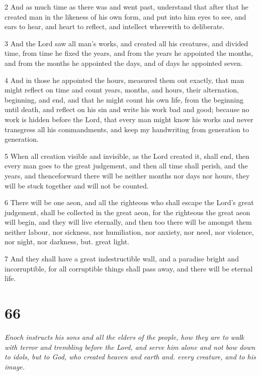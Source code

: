 \par 2 And as much time as there was and went past, understand that after that he created man in the likeness of his own form, and put into him eyes to see, and ears to hear, and heart to reflect, and intellect wherewith to deliberate.

\par 3 And the Lord saw all man's works, and created all his creatures, and divided time, from time he fixed the years, and from the years he appointed the months, and from the months he appointed the days, and of days he appointed seven.

\par 4 And in those he appointed the hours, measured them out exactly, that man might reflect on time and count years, months, and hours, their alternation, beginning, and end, and that he might count his own life, from the beginning until death, and reflect on his sin and write his work bad and good; because no work is hidden before the Lord, that every man might know his works and never transgress all his commandments, and keep my handwriting from generation to generation.

\par 5 When all creation visible and invisible, as the Lord created it, shall end, then every man goes to the great judgement, and then all time shall perish, and the years, and thenceforward there will be neither months nor days nor hours, they will be stuck together and will not be counted.

\par 6 There will be one aeon, and all the righteous who shall escape the Lord's great judgement, shall be collected in the great aeon, for the righteous the great aeon will begin, and they will live eternally, and then too there will be amongst them neither labour, nor sickness, nor humiliation, nor anxiety, nor need, nor violence, nor night, nor darkness, but. great light.

\par 7 And they shall have a great indestructible wall, and a paradise bright and incorruptible, for all corruptible things shall pass away, and there will be eternal life.

\chapter{66}

\par \textit{Enoch instructs his sons and all the elders of the people, how they are to walk with terror and trembling before the Lord, and serve him alone and not bow down to idols, but to God, who created heaven and earth and. every creature, and to his image.}

